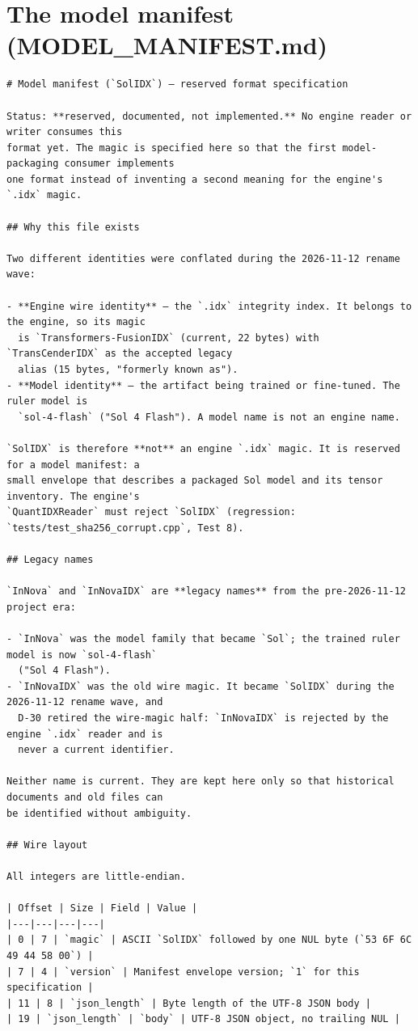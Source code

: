 \section*{The model manifest (MODEL_MANIFEST.md)}
\begin{verbatim}
# Model manifest (`SolIDX`) — reserved format specification

Status: **reserved, documented, not implemented.** No engine reader or writer consumes this
format yet. The magic is specified here so that the first model-packaging consumer implements
one format instead of inventing a second meaning for the engine's `.idx` magic.

## Why this file exists

Two different identities were conflated during the 2026-11-12 rename wave:

- **Engine wire identity** — the `.idx` integrity index. It belongs to the engine, so its magic
  is `Transformers-FusionIDX` (current, 22 bytes) with `TransCenderIDX` as the accepted legacy
  alias (15 bytes, "formerly known as").
- **Model identity** — the artifact being trained or fine-tuned. The ruler model is
  `sol-4-flash` ("Sol 4 Flash"). A model name is not an engine name.

`SolIDX` is therefore **not** an engine `.idx` magic. It is reserved for a model manifest: a
small envelope that describes a packaged Sol model and its tensor inventory. The engine's
`QuantIDXReader` must reject `SolIDX` (regression: `tests/test_sha256_corrupt.cpp`, Test 8).

## Legacy names

`InNova` and `InNovaIDX` are **legacy names** from the pre-2026-11-12 project era:

- `InNova` was the model family that became `Sol`; the trained ruler model is now `sol-4-flash`
  ("Sol 4 Flash").
- `InNovaIDX` was the old wire magic. It became `SolIDX` during the 2026-11-12 rename wave, and
  D-30 retired the wire-magic half: `InNovaIDX` is rejected by the engine `.idx` reader and is
  never a current identifier.

Neither name is current. They are kept here only so that historical documents and old files can
be identified without ambiguity.

## Wire layout

All integers are little-endian.

| Offset | Size | Field | Value |
|---|---|---|---|
| 0 | 7 | `magic` | ASCII `SolIDX` followed by one NUL byte (`53 6F 6C 49 44 58 00`) |
| 7 | 4 | `version` | Manifest envelope version; `1` for this specification |
| 11 | 8 | `json_length` | Byte length of the UTF-8 JSON body |
| 19 | `json_length` | `body` | UTF-8 JSON object, no trailing NUL |


\end{verbatim}
